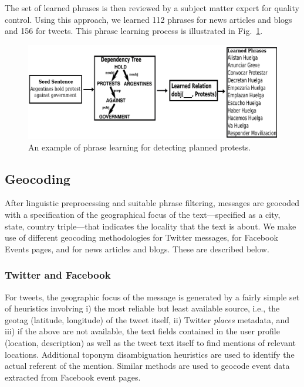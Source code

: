 \documentclass[letterpaper]{article}
\begin{document}
The set of learned phrases is then reviewed by a subject matter expert for quality control.  
Using this approach, we learned 112 phrases for news articles and blogs and 156 for tweets.  
This phrase learning process is illustrated in Fig.~\ref{fig:phraselearning}.

\begin{figure}
  \centering
\includegraphics[scale=0.3]{figures/phraseLearning}
\caption{An example of phrase learning for detecting planned protests.}
\label{fig:phraselearning}
\end{figure}

\subsection{Geocoding}
\label{subsection:geocoding}
After linguistic preprocessing and suitable phrase filtering,
messages are geocoded with a
specification of the geographical focus of the text---specified as a
city, state, country triple---that indicates the locality that the
text is about. We make use of different geocoding methodologies
for Twitter messages, for Facebook Events pages, and for news articles and blogs.
These are described below.

\subsubsection{Twitter and Facebook}
For tweets, the geographic focus of the message is generated by a fairly simple
set of heuristics involving i) the most reliable but least available
source, i.e., the geotag (latitude, longitude) of the tweet itself, ii)
Twitter {\it places} metadata, and iii) if the above are not available,
the text fields contained in the user profile (location, description) as
well as the tweet text itself to find mentions of relevant locations.
Additional toponym disambiguation heuristics are used to identify the
actual referent of the mention.  Similar methods are used to geocode
event data extracted from Facebook event pages.  
\end{document}
